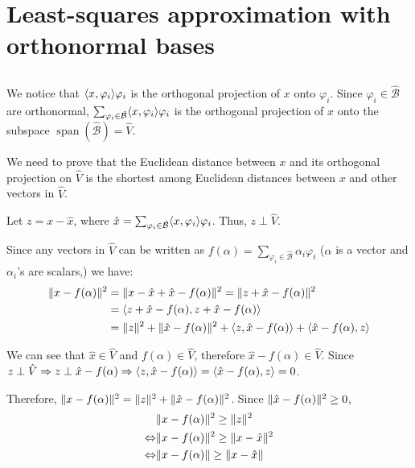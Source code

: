 \section{Least-squares approximation with orthonormal bases}\label{sec:part3}

\subsection{}
We notice that $\langle x, \varphi_i \rangle\varphi_i$ is the orthogonal projection of $x$ onto $\varphi_i$. Since $\varphi_i \in \hat{\mathcal{B}}$ are orthonormal, $\sum_{\varphi_i \in \hat{\mathcal{B}}} \langle x, \varphi_i \rangle\varphi_i$ is the orthogonal projection of $x$ onto the subspace $\operatorname{span}(\hat{\mathcal{B}}) = \hat{V}$.

We need to prove that the Euclidean distance between $x$ and its orthogonal projection on $\hat{V}$ is the shortest among Euclidean distances between $x$ and other vectors in $\hat{V}$.

Let $z = x - \hat{x}$, where $\hat{x} = \sum_{\varphi_i \in \hat{\mathcal{B}}} \langle x, \varphi_i \rangle\varphi_i$. Thus, $z \perp \hat{V}$.

Since any vectors in $\hat{V}$ can be written as $f(\alpha) = \sum_{\varphi_i \in \hat{\mathcal{B}}} \alpha_i \varphi_i$ ($\alpha$ is a vector and $\alpha_i$'s are scalars,) we have:
\begin{align*}
	\lVert x - f(\alpha) \rVert^2 &= \lVert x - \hat{x} + \hat{x} - f(\alpha) \rVert^2 = \lVert z + \hat{x}- f(\alpha) \rVert^2 \\
	&= \langle z+\hat{x}-f(\alpha), z+\hat{x}-f(\alpha) \rangle \\
	&= \lVert z \rVert^2 + \lVert \hat{x} - f(\alpha) \rVert^2 + \langle z, \hat{x}-f(\alpha) \rangle + \langle \hat{x}-f(\alpha), z \rangle
\end{align*}

We can see that $\hat{x} \in \hat{V}$ and $f(\alpha) \in \hat{V}$, therefore $\hat{x}-f(\alpha) \in \hat{V}$. Since $z \perp \hat{V} \Rightarrow z \perp \hat{x} - f(\alpha) \Rightarrow \langle z, \hat{x}-f(\alpha) \rangle = \langle \hat{x}-f(\alpha), z \rangle = 0$.

Therefore, $\lVert x - f(\alpha) \rVert^2 = \lVert z \rVert^2 + \lVert \hat{x} - f(\alpha) \rVert^2$. Since $\lVert \hat{x}-f(\alpha) \rVert^2 \geq 0$,
\begin{align*}
	&\lVert x - f(\alpha) \rVert^2 \geq \lVert z \rVert^2 \\
	\Leftrightarrow &\lVert x - f(\alpha) \rVert^2 \geq \lVert x - \hat{x} \rVert^2 \\
	\Leftrightarrow &\lVert x - f(\alpha) \rVert \geq \lVert x - \hat{x} \rVert
\end{align*}


